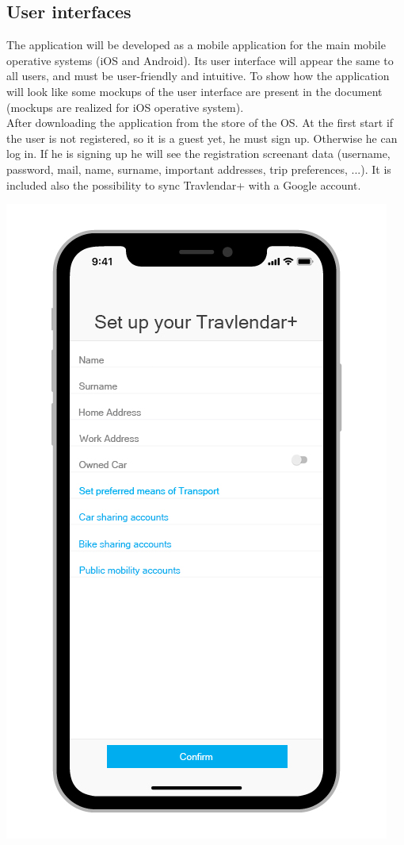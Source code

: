 \subsection{User interfaces}
The application will be developed as a mobile application for the main mobile operative systems (iOS and Android).
Its user interface will appear the same to all users, and must be user-friendly and intuitive. To show how the application will look like some mockups of the user interface are present in the document (mockups are realized for iOS operative system).\\
After downloading the application from the store of the OS. At the first start if the user is not registered, so it is a guest yet, he must sign up. Otherwise he can log in. If he is signing up he will see the registration screenant data (username, password, mail, name, surname, important addresses, trip preferences, ...). It is included also the possibility to sync Travlendar+ with a Google account.
\begin{center}
\includegraphics[scale=2.4]{MainMatter/images/ui/firstscreen}
\end{center}
